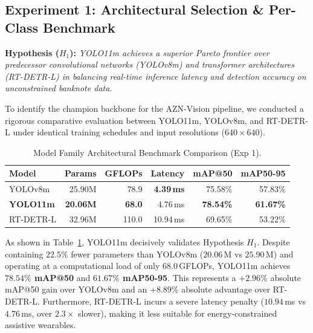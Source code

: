 \documentclass[conference]{IEEEtran}
\begin{document}
\subsection{Experiment 1: Architectural Selection \& Per-Class Benchmark}
\label{subsec:exp1}

\noindent\textbf{Hypothesis ($H_1$):} \textit{YOLO11m achieves a superior Pareto frontier over predecessor convolutional networks (YOLOv8m) and transformer architectures (RT-DETR-L) in balancing real-time inference latency and detection accuracy on unconstrained banknote data.}

To identify the champion backbone for the AZN-Vision pipeline, we conducted a rigorous comparative evaluation between YOLO11m, YOLOv8m, and RT-DETR-L under identical training schedules and input resolutions ($640 \times 640$).

\begin{table}[h]
\centering
\caption{Model Family Architectural Benchmark Comparison (Exp 1).}
\label{tab:exp1_models}
\scriptsize
\setlength{\tabcolsep}{2.5pt}
\begin{tabular}{lrrrrr}
\toprule
\textbf{Model} & \textbf{Params} & \textbf{GFLOPs} & \textbf{Latency} & \textbf{mAP@50} & \textbf{mAP50-95} \\
\midrule
YOLOv8m & 25.90M & 78.9 & \textbf{4.39\,ms} & 75.58\% & 57.83\% \\
\textbf{YOLO11m} & \textbf{20.06M} & \textbf{68.0} & 4.76\,ms & \textbf{78.54\%} & \textbf{61.67\%} \\
RT-DETR-L & 32.96M & 110.0 & 10.94\,ms & 69.65\% & 53.22\% \\
\bottomrule
\end{tabular}
\end{table}

As shown in Table~\ref{tab:exp1_models}, YOLO11m decisively validates Hypothesis $H_1$. Despite containing $22.5\%$ fewer parameters than YOLOv8m ($20.06$\,M vs $25.90$\,M) and operating at a computational load of only $68.0$\,GFLOPs, YOLO11m achieves \textbf{$78.54\%$ mAP@50} and \textbf{$61.67\%$ mAP50-95}. This represents a $+2.96\%$ absolute mAP@50 gain over YOLOv8m and an $+8.89\%$ absolute advantage over RT-DETR-L. Furthermore, RT-DETR-L incurs a severe latency penalty ($10.94$\,ms vs $4.76$\,ms, over $2.3\times$ slower), making it less suitable for energy-constrained assistive wearables.
\end{document}
